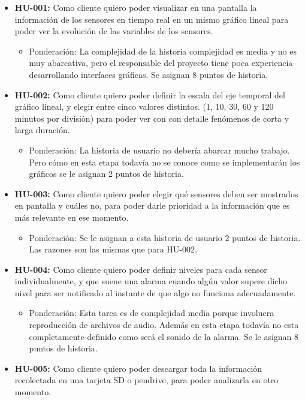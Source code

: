 \documentclass[11pt]{charter}
\begin{document}
\begin{itemize}
\item \textbf{HU-001:} Como cliente quiero poder visualizar en una pantalla la información de los sensores en tiempo real en un mismo gráfico lineal para poder ver la evolución de las variables de los sensores.
	\begin{itemize}
	\item Ponderación: La complejidad de la historia complejidad es media y no es muy abarcativa, pero el responsable del proyecto tiene poca experiencia desarrollando interfaces gráficas. Se asignan 8 puntos de historia.
	\end{itemize}
\item \textbf{HU-002:} Como cliente quiero poder definir la escala del eje temporal del gráfico lineal, y elegir entre cinco valores distintos. (1, 10, 30, 60 y 120 minutos por división) para poder ver con con detalle fenómenos de corta y larga duración.
	\begin{itemize}
	\item Ponderación: La historia de usuario no debería abarcar mucho trabajo. Pero cómo en esta etapa todavía no se conoce como se implementarán los gráficos se le asignan 2 puntos de historia.
	\end{itemize}
\item \textbf{HU-003:} Como cliente quiero poder elegir qué sensores deben ser mostrados en pantalla y cuáles no, para poder darle prioridad a la información que es más relevante en ese momento.
	\begin{itemize}
	\item Ponderación: Se le asignan a esta historia de usuario 2 puntos de historia. Las razones son las mismas que para HU-002.
	\end{itemize}
\item \textbf{HU-004:} Como cliente quiero poder definir niveles para cada sensor individualmente, y que suene una alarma cuando algún valor supere dicho nivel para ser notificado al instante de que algo no funciona adecuadamente.
	\begin{itemize}
	\item Ponderación: Esta tarea es de complejidad media porque involucra reproducción de archivos de audio. Además en esta etapa todavía no esta completamente definido como será el sonido de la alarma. Se le asignan 8 puntos de historia.
	\end{itemize}
\item \textbf{HU-005:} Como cliente quiero poder descargar toda la información recolectada en una tarjeta SD o pendrive, para poder analizarla en otro momento.

\end{itemize}
\end{document}
